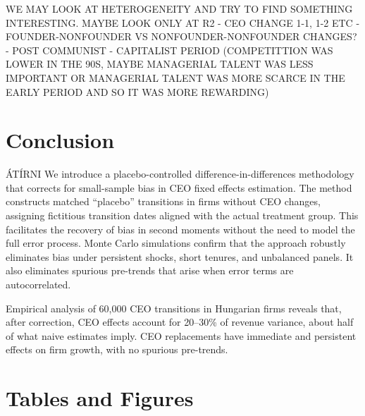 \documentclass[11pt,a4paper]{article}
\begin{document}
WE MAY LOOK AT HETEROGENEITY AND TRY TO FIND SOMETHING INTERESTING. MAYBE LOOK ONLY AT R2
- CEO CHANGE 1-1, 1-2 ETC 
- FOUNDER-NONFOUNDER VS NONFOUNDER-NONFOUNDER CHANGES?
- POST COMMUNIST - CAPITALIST PERIOD (COMPETITTION WAS LOWER IN THE 90S, MAYBE MANAGERIAL TALENT WAS LESS IMPORTANT OR MANAGERIAL TALENT WAS MORE SCARCE IN THE EARLY PERIOD AND SO IT WAS MORE REWARDING)


\section{Conclusion}

ÁTÍRNI We introduce a placebo-controlled difference-in-differences methodology that corrects for small-sample bias in CEO fixed effects estimation. The method constructs matched “placebo” transitions in firms without CEO changes, assigning fictitious transition dates aligned with the actual treatment group. This facilitates the recovery of bias in second moments without the need to model the full error process. Monte Carlo simulations confirm that the approach robustly eliminates bias under persistent shocks, short tenures, and unbalanced panels. It also eliminates spurious pre-trends that arise when error terms are autocorrelated.

Empirical analysis of 60,000 CEO transitions in Hungarian firms reveals that, after correction, CEO effects account for 20–30\% of revenue variance, about half of what naive estimates imply. CEO replacements have immediate and persistent effects on firm growth, with no spurious pre-trends. 
\clearpage 


%

\clearpage

\section*{Tables and Figures}
\end{document}
